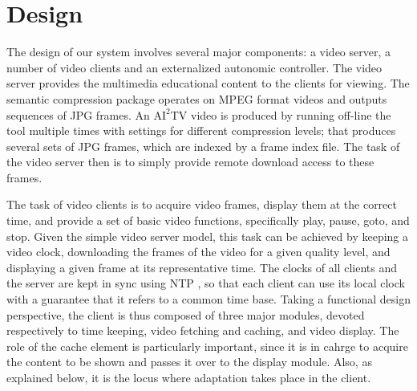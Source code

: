 \documentclass{sig-alternate}
\begin{document}
\section{Design} \label{design}

The design of our system involves several major components: a video
server, a number of video clients and an externalized autonomic
controller.
%
%
The video server provides the multimedia educational content to the
clients for viewing.  The semantic compression package operates on
MPEG format videos and outputs sequences of JPG frames.  An
$\mathrm{AI}^2$TV video is produced by running off-line the tool
multiple times with settings for different compression levels; that
produces several sets of JPG frames, which are indexed by a frame
index file.  The task of the video server then is to simply provide
remote download access to these frames.

The task of video clients is to acquire video frames, display them at
the correct time, and provide a set of basic video functions,
specifically play, pause, goto, and stop.  Given the simple video
server model, this task can be achieved by keeping a video clock,
downloading the frames of the video for a given quality level, and
displaying a given frame at its representative time. The clocks of all
clients and the server are kept in sync using NTP \cite{NTP}, so that
each client can use its local clock with a guarantee that it refers to
a common time base. Taking a functional design perspective, the client
is thus composed of three major modules, devoted respectively to time
keeping, video fetching and caching, and video display. The role of
the cache element is particularly important, since it is in cahrge to
acquire the content to be shown and passes it over to the display
module. Also, as explained below, it is the locus where adaptation
takes place in the client.
\end{document}
